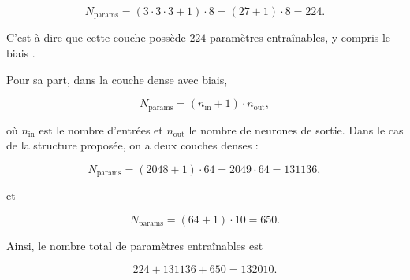\begin{equation}
N_{\text{params}}=(3\cdot 3\cdot 3+1)\cdot 8=(27+1)\cdot 8=224.
\end{equation}

C’est-à-dire que cette couche possède $224$ paramètres entraînables, y compris le biais \cite{keras_conv2d}.

Pour sa part, dans la couche dense avec biais,

\begin{equation}
N_{\text{params}}=(n_{\text{in}}+1)\cdot n_{\text{out}},
\end{equation}

où $n_{\text{in}}$ est le nombre d’entrées et $n_{\text{out}}$ le nombre de neurones de sortie. Dans le cas de la structure proposée, on a deux couches denses :

\begin{equation}
N_{\text{params}}=(2048+1)\cdot 64=2049\cdot 64=131136,
\end{equation}

et

\begin{equation}
N_{\text{params}}=(64+1)\cdot 10=650.
\end{equation}

Ainsi, le nombre total de paramètres entraînables est

\begin{equation}
224+131136+650=132010.
\end{equation}
